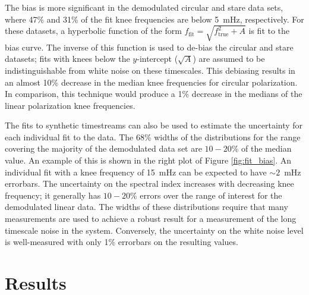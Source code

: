 \documentclass[twocolumn, tighten, numberedappendix, twocolappendix]{aastex63}
\begin{document}
The bias is more significant in the demodulated circular and stare data sets, where 47\% and 31\% of the fit knee frequencies are below 5~mHz, respectively. For these datasets, a hyperbolic function of the form $f_\mathrm{fit} = \sqrt{f_\mathrm{true}^2+A}$ is fit to the bias curve. The inverse of this function is used to de-bias the circular and stare datasets; fits with knees below the $y$-intercept ($\sqrt{A}$) are assumed to be indistinguishable from white noise on these timescales. This debiasing results in an almost 10\% decrease in the median knee frequencies for circular polarization. In comparison, this technique would produce a 1\% decrease in the medians of the linear polarization knee frequencies.

The fits to synthetic timestreams can also be used to estimate the uncertainty for each individual fit to the data. The 68\% widths of the distributions for the range covering the majority of the demodulated data set are $10-20$\% of the median value. An example of this is shown in the right plot of Figure \ref{fig:fit_bias}. An individual fit with a knee frequency of 15~mHz can be expected to have $\sim2$~mHz errorbars. The uncertainty on the spectral index increases with decreasing knee frequency; it generally has {$10-20$\%} errors over the range of interest for the demodulated linear data.  The widths of these distributions require that many measurements are used to achieve a robust result for a measurement of the long timescale noise in the system. Conversely, the uncertainty on the white noise level is well-measured with only 1\% errorbars on the resulting values.


\section{Results}
\end{document}

